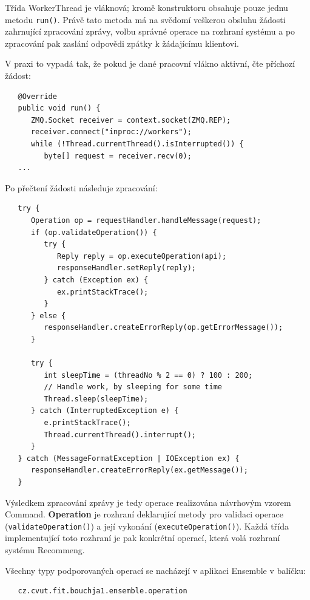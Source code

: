 \documentclass[thesis=M,czech]{FITthesis}[2014/05/07]
\begin{document}
Třída WorkerThread je vláknová; kromě konstruktoru obsahuje pouze jednu metodu \texttt{run()}. Právě tato metoda má na svědomí veškerou obsluhu žádosti zahrnující zpracování zprávy, volbu správné operace na rozhraní systému a po zpracování pak zaslání odpovědi zpátky k žádajícímu klientovi.

V praxi to vypadá tak, že pokud je dané pracovní vlákno aktivní, čte příchozí žádost:

\begin{verbatim}
   @Override
   public void run() {
      ZMQ.Socket receiver = context.socket(ZMQ.REP);
      receiver.connect("inproc://workers");
      while (!Thread.currentThread().isInterrupted()) {
         byte[] request = receiver.recv(0);
   ...
\end{verbatim}

Po přečtení žádosti následuje zpracování:

\begin{verbatim}
   try {
      Operation op = requestHandler.handleMessage(request);
      if (op.validateOperation()) {
         try {
            Reply reply = op.executeOperation(api);
            responseHandler.setReply(reply);
         } catch (Exception ex) {
            ex.printStackTrace();
         }
      } else {
         responseHandler.createErrorReply(op.getErrorMessage());
      }
      
      try {
         int sleepTime = (threadNo % 2 == 0) ? 100 : 200;
         // Handle work, by sleeping for some time
         Thread.sleep(sleepTime);
      } catch (InterruptedException e) {
         e.printStackTrace();
         Thread.currentThread().interrupt();
      }
   } catch (MessageFormatException | IOException ex) {
      responseHandler.createErrorReply(ex.getMessage());
   }
\end{verbatim}

Výsledkem zpracování zprávy je tedy operace realizována návrhovým vzorem Command. \textbf{Operation} je rozhraní deklarující metody pro validaci operace (\texttt{validateOperation()}) a její vykonání (\texttt{executeOperation()}). Každá třída implementující toto rozhraní je pak konkrétní operací, která volá rozhraní systému Recommeng. 

Všechny typy podporovaných operací se nacházejí v aplikaci Ensemble v balíčku:

\begin{verbatim}
   cz.cvut.fit.bouchja1.ensemble.operation
\end{verbatim}
\end{document}
